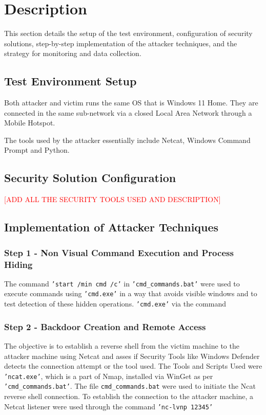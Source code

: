 \documentclass[11pt]{article}
\begin{document}
		\newpage
		\section{Description}
			This section details the setup of the test environment, configuration of security solutions, step-by-step implementation of the attacker techniques, and the strategy for monitoring and data collection.
		
			\subsection{Test Environment Setup}
				Both attacker and victim runs the same OS that is Windows 11 Home. They are connected in the same sub-network via a closed Local Area Network through a Mobile Hotspot.\par
				The tools used by the attacker essentially include Netcat, Windows Command Prompt and Python.
			\subsection{Security Solution Configuration}
				\textcolor{red}{[ADD ALL THE SECURITY TOOLS USED AND DESCRIPTION]}
				
			\subsection{Implementation of Attacker Techniques}
				\subsubsection{Step 1 - Non Visual Command Execution and Process Hiding}
					The command \texttt{'start /min cmd /c'} in \texttt{'cmd\_commands.bat'} were used to execute commands using \texttt{'cmd.exe'} in a way that avoids visible windows and to test detection of these hidden operations. \texttt{'cmd.exe'} via the command
				\subsubsection{Step 2 - Backdoor Creation and Remote Access}
					The objective is to establish a reverse shell from the victim machine to the attacker machine using Netcat and asses if Security Tools like Windows Defender detects the connection attempt or the tool used.
					The Tools and Scripts Used were \texttt{'ncat.exe'}, which is a part of Nmap, installed via WinGet as per \texttt{'cmd\_commands.bat'}. The file \texttt{cmd\_commands.bat} were used to initiate the Ncat reverse shell connection. To establish the connection to the attacker machine, a Netcat listener were used through the command \texttt{'nc-lvnp 12345'}\\\par
					
\end{document}

